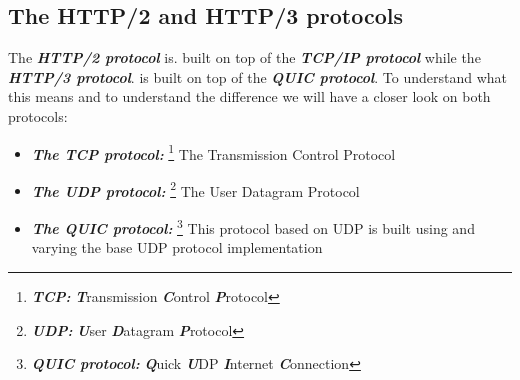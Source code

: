\documentclass[10pt,a4paper,english]{article}
\newcommand{\abbrhighcol}[1]{\textbf{\textit{#1}}}
\begin{document}
\begin{multicols}{2}
\subsection{The HTTP/2 and HTTP/3 protocols}
\begin{flushleft}
The \abbrhighcol {HTTP/2 protocol} is. built on top of the \abbrhighcol {TCP/IP protocol} while the \abbrhighcol {HTTP/3 protocol}. is built on top of the \abbrhighcol{QUIC protocol}.
To understand what this means and to understand the difference we will have a closer look on both protocols: 
\begin{itemize}
\item{\abbrhighcol {The TCP protocol:} \footnote{\abbrhighcol {TCP: } \abbrhighcol {T}ransmission \abbrhighcol {C}ontrol \abbrhighcol {P}rotocol} The Transmission Control Protocol} 
\item{\abbrhighcol{The UDP protocol:} \footnote{\abbrhighcol{UDP: }\abbrhighcol{U}ser \abbrhighcol{D}atagram \abbrhighcol{P}rotocol} The User Datagram Protocol}
\item{\abbrhighcol{The QUIC protocol:} \footnote{\abbrhighcol {QUIC protocol:} \abbrhighcol{Q}uick \abbrhighcol {U}DP \abbrhighcol{I}nternet \abbrhighcol{C}onnection} This protocol based on UDP is built using and varying the base UDP protocol implementation }
\end{itemize}
\end{flushleft}



\end{multicols}
\end{document}
